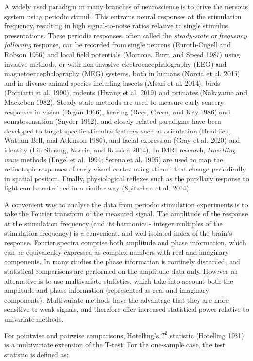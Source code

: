 \documentclass[]{article}
\begin{document}
A widely used paradigm in many branches of neuroscience is to drive the nervous system using periodic stimuli. This entrains neural responses at the stimulation frequency, resulting in high signal-to-noise ratios relative to single stimulus presentations. These periodic responses, often called the \emph{steady-state} or \emph{frequency following} response, can be recorded from single neurons (Enroth-Cugell and Robson 1966) and local field potentials (Morrone, Burr, and Speed 1987) using invasive methods, or with non-invasive electroencephalography (EEG) and magnetoencephalography (MEG) systems, both in humans (Norcia et al. 2015) and in diverse animal species including insects (Afsari et al. 2014), birds (Porciatti et al. 1990), rodents (Hwang et al. 2019) and primates (Nakayama and Mackeben 1982). Steady-state methods are used to measure early sensory responses in vision (Regan 1966), hearing (Rees, Green, and Kay 1986) and somatosensation (Snyder 1992), and closely related paradigms have been developed to target specific stimulus features such as orientation (Braddick, Wattam-Bell, and Atkinson 1986), and facial expression (Gray et al. 2020) and identity (Liu-Shuang, Norcia, and Rossion 2014). In fMRI research, \emph{travelling wave} methods (Engel et al. 1994; Sereno et al. 1995) are used to map the retinotopic responses of early visual cortex using stimuli that change periodically in spatial position. Finally, physiological reflexes such as the pupillary response to light can be entrained in a similar way (Spitschan et al. 2014).

A convenient way to analyse the data from periodic stimulation experiments is to take the Fourier transform of the measured signal. The amplitude of the response at the stimulation frequency (and its harmonics - integer multiples of the stimulation frequency) is a convenient, and well-isolated index of the brain's response. Fourier spectra comprise both amplitude and phase information, which can be equivalently expressed as complex numbers with real and imaginary components. In many studies the phase information is routinely discarded, and statistical comparisons are performed on the amplitude data only. However an alternative is to use multivariate statistics, which take into account both the amplitude and phase information (represented as real and imaginary components). Multivariate methods have the advantage that they are more sensitive to weak signals, and therefore offer increased statistical power relative to univariate methods.

For pointwise and pairwise comparisons, Hotelling's \(T^2\) statistic (Hotelling 1931) is a multivariate extension of the T-test. For the one-sample case, the test statistic is defined as:
\end{document}
